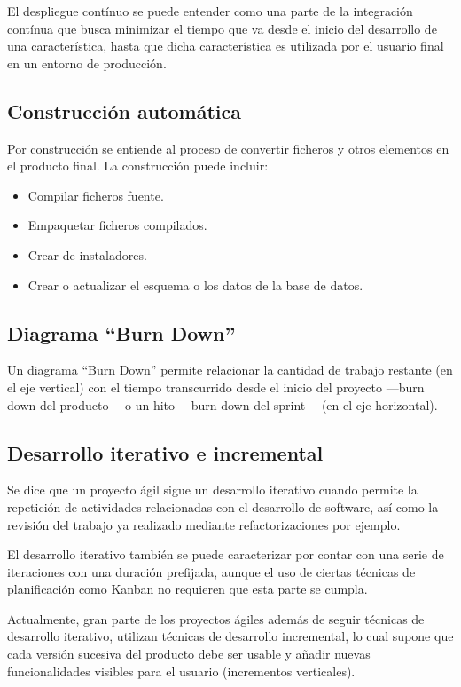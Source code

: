 El despliegue contínuo se puede entender como una parte de la integración contínua que busca minimizar el tiempo que va desde el inicio del desarrollo de una característica, hasta que dicha característica es utilizada por el usuario final en un entorno de producción.

\subsection{Construcción automática}

Por construcción se entiende al proceso de convertir ficheros y otros elementos en el producto final. La construcción puede incluir:

\begin{itemize}
	\item Compilar ficheros fuente.
	\item Empaquetar ficheros compilados.
	\item Crear de instaladores.
	\item Crear o actualizar el esquema o los datos de la base de datos.
\end{itemize}

\subsection{Diagrama ``Burn Down''}

Un diagrama ``Burn Down'' permite relacionar la cantidad de trabajo restante (en el eje vertical) con el tiempo transcurrido desde el inicio del proyecto —burn down del producto— o un hito —burn down del sprint— (en el eje horizontal).

\subsection{Desarrollo iterativo e incremental}

Se dice que un proyecto ágil sigue un desarrollo iterativo cuando permite la repetición de actividades relacionadas con el desarrollo de software, así como la revisión del trabajo ya realizado mediante refactorizaciones por ejemplo.

El desarrollo iterativo también se puede caracterizar por contar con una serie de iteraciones con una duración prefijada, aunque el uso de ciertas técnicas de planificación como Kanban no requieren que esta parte se cumpla.

Actualmente, gran parte de los proyectos ágiles además de seguir técnicas de desarrollo iterativo, utilizan técnicas de desarrollo incremental, lo cual supone que cada versión sucesiva del producto debe ser usable y añadir nuevas funcionalidades visibles para el usuario (incrementos verticales).

